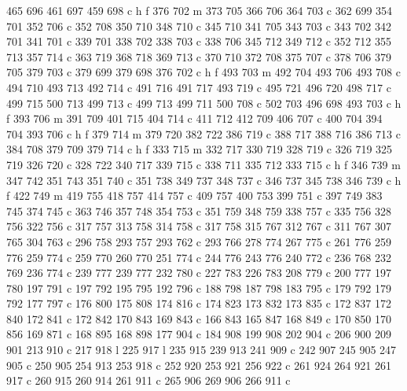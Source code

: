 {{        465 696 461 697 459 698 c
        h f
        376 702 m
        373 705 366 706 364 703 c
        362 699 354 701 352 706 c
        352 708 350 710 348 710 c
        345 710 341 705 343 703 c
        343 702 342 701 341 701 c
        339 701 338 702 338 703 c
        338 706 345 712 349 712 c
        352 712 355 713 357 714 c
        363 719 368 718 369 713 c
        370 710 372 708 375 707 c
        378 706 379 705 379 703 c
        379 699 379 698 376 702 c
        h f
        493 703 m
        492 704 493 706 493 708 c
        494 710 493 713 492 714 c
        491 716 491 717 493 719 c
        495 721 496 720 498 717 c
        499 715 500 713 499 713 c
        499 713 499 711 500 708 c
        502 703 496 698 493 703 c
        h f
        393 706 m
        391 709 401 715 404 714 c
        411 712 412 709 406 707 c
        400 704 394 704 393 706 c
        h f
        379 714 m
        379 720 382 722 386 719 c
        388 717 388 716 386 713 c
        384 708 379 709 379 714 c
        h f
        333 715 m
        332 717 330 719 328 719 c
        326 719 325 719 326 720 c
        328 722 340 717 339 715 c
        338 711 335 712 333 715 c
        h f
        346 739 m
        347 742 351 743 351 740 c
        351 738 349 737 348 737 c
        346 737 345 738 346 739 c
        h f
        422 749 m
        419 755 418 757 414 757 c
        409 757 400 753 399 751 c
        397 749 383 745 374 745 c
        363 746 357 748 354 753 c
        351 759 348 759 338 757 c
        335 756 328 756 322 756 c
        317 757 313 758 314 758 c
        317 758 315 767 312 767 c
        311 767 307 765 304 763 c
        296 758 293 757 293 762 c
        293 766 278 774 267 775 c
        261 776 259 776 259 774 c
        259 770 260 770 251 774 c
        244 776 243 776 240 772 c
        236 768 232 769 236 774 c
        239 777 239 777 232 780 c
        227 783 226 783 208 779 c
        200 777 197 780 197 791 c
        197 792 195 795 192 796 c
        188 798 187 798 183 795 c
        179 792 179 792 177 797 c
        176 800 175 808 174 816 c
        174 823 173 832 173 835 c
        172 837 172 840 172 841 c
        172 842 170 843 169 843 c
        166 843 165 847 168 849 c
        170 850 170 856 169 871 c
        168 895 168 898 177 904 c
        184 908 199 908 202 904 c
        206 900 209 901 213 910 c
        217 918 l
        225 917 l
        235 915 239 913 241 909 c
        242 907 245 905 247 905 c
        250 905 254 913 253 918 c
        252 920 253 921 256 922 c
        261 924 264 921 261 917 c
        260 915 260 914 261 911 c
        265 906 269 906 266 911 c
}}
